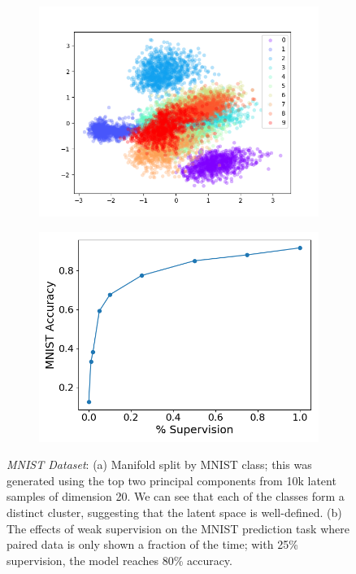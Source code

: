 \documentclass{article}
\begin{document}
\begin{figure}[!h]
\centering
    \begin{subfigure}[b]{.32\linewidth}
        \centering
        \includegraphics[width=\linewidth]{mnist_mmvae_pca_manifold.png}
        \caption{}
    \end{subfigure}
    \begin{subfigure}[b]{.32\linewidth}
        \centering
        \includegraphics[width=\linewidth]{mnist_mmvae_joint_weak_supervision.png}
        \caption{}
    \end{subfigure}
    \caption{\emph{MNIST Dataset}: (a) Manifold split by MNIST class; this was generated using the top two principal components from 10k latent samples of dimension 20. We can see that each of the classes form a distinct cluster, suggesting that the latent space is well-defined. (b) The effects of weak supervision on the MNIST prediction task where paired data is only shown a fraction of the time; with 25\% supervision, the model reaches 80\% accuracy.}
    \label{fig:mnist:weaksupervision}
\end{figure}
\end{document}
